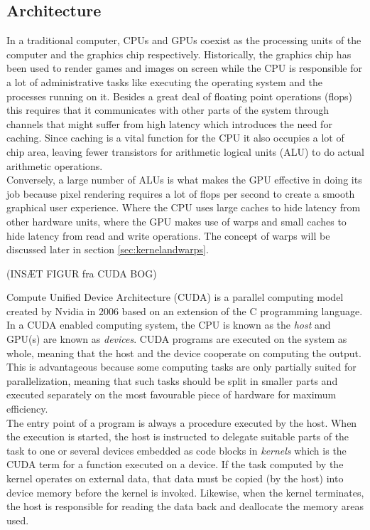 
\subsection{Architecture}
In a traditional computer, CPUs and GPUs coexist as the processing units of the computer and the graphics chip respectively. Historically, the graphics chip has been used to render games and images on screen while the CPU is responsible for a lot of administrative tasks like executing the operating system and the processes running on it. Besides a great deal of floating point operations (flops) this requires that it communicates with other parts of the system through channels that might suffer from high latency which introduces the need for caching. Since caching is a vital function for the CPU it also occupies a lot of chip area, leaving fewer transistors for arithmetic logical units (ALU) to do actual arithmetic operations. \\

Conversely, a large number of ALUs is what makes the GPU effective in doing its job because pixel rendering requires a lot of flops per second to create a smooth graphical user experience. Where the CPU uses large caches to hide latency from other hardware units, where the GPU makes use of warps and small caches to hide latency from read and write operations. The concept of warps will be discussed later in section \ref{sec:kernelandwarps}.

(INSÆT FIGUR fra CUDA BOG)

Compute Unified Device Architecture (CUDA) is a parallel computing model created by Nvidia in 2006 based on an extension of the C programming language. In a CUDA enabled computing system, the CPU is known as the \emph{host} and GPU(s) are known as \emph{devices}. CUDA programs are executed on the system as whole, meaning that the host and the device cooperate on computing the output. This is advantageous because some computing tasks are only partially suited for parallelization, meaning that such tasks should be split in smaller parts and executed separately on the most favourable piece of hardware for maximum efficiency.\\

The entry point of a program is always a procedure executed by the host. When the execution is started, the host is instructed to delegate suitable parts of the task to one or several devices embedded as code blocks in \emph{kernels} which is the CUDA term for a function executed on a device. If the task computed by the kernel operates on external data, that data must be copied (by the host) into device memory before the kernel is invoked. Likewise, when the kernel terminates, the host is responsible for reading the data back and deallocate the memory areas used.\\

